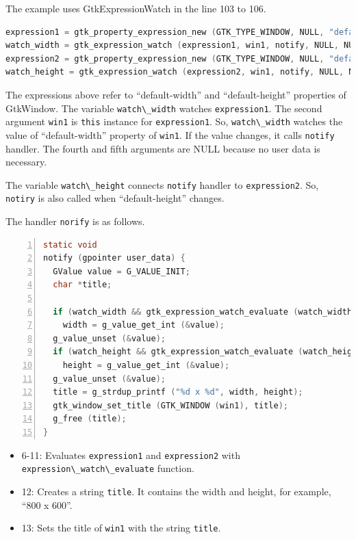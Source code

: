 The example uses GtkExpressionWatch in the line 103 to 106.

\begin{lstlisting}[language=C]
expression1 = gtk_property_expression_new (GTK_TYPE_WINDOW, NULL, "default-width");
watch_width = gtk_expression_watch (expression1, win1, notify, NULL, NULL);
expression2 = gtk_property_expression_new (GTK_TYPE_WINDOW, NULL, "default-height");
watch_height = gtk_expression_watch (expression2, win1, notify, NULL, NULL);
\end{lstlisting}

The expressions above refer to ``default-width'' and ``default-height''
properties of GtkWindow. The variable
\passthrough{\lstinline!watch\_width!} watches
\passthrough{\lstinline!expression1!}. The second argument
\passthrough{\lstinline!win1!} is \passthrough{\lstinline!this!}
instance for \passthrough{\lstinline!expression1!}. So,
\passthrough{\lstinline!watch\_width!} watches the value of
``default-width'' property of \passthrough{\lstinline!win1!}. If the
value changes, it calls \passthrough{\lstinline!notify!} handler. The
fourth and fifth arguments are NULL because no user data is necessary.

The variable \passthrough{\lstinline!watch\_height!} connects
\passthrough{\lstinline!notify!} handler to
\passthrough{\lstinline!expression2!}. So,
\passthrough{\lstinline!notiry!} is also called when ``default-height''
changes.

The handler \passthrough{\lstinline!norify!} is as follows.

\begin{lstlisting}[language=C, numbers=left]
static void
notify (gpointer user_data) {
  GValue value = G_VALUE_INIT;
  char *title;

  if (watch_width && gtk_expression_watch_evaluate (watch_width, &value))
    width = g_value_get_int (&value);
  g_value_unset (&value);
  if (watch_height && gtk_expression_watch_evaluate (watch_height, &value))
    height = g_value_get_int (&value);
  g_value_unset (&value);
  title = g_strdup_printf ("%d x %d", width, height);
  gtk_window_set_title (GTK_WINDOW (win1), title);
  g_free (title);
}
\end{lstlisting}

\begin{itemize}
\tightlist
\item
  6-11: Evaluates \passthrough{\lstinline!expression1!} and
  \passthrough{\lstinline!expression2!} with
  \passthrough{\lstinline!expression\_watch\_evaluate!} function.
\item
  12: Creates a string \passthrough{\lstinline!title!}. It contains the
  width and height, for example, ``800 x 600''.
\item
  13: Sets the title of \passthrough{\lstinline!win1!} with the string
  \passthrough{\lstinline!title!}.
\end{itemize}


